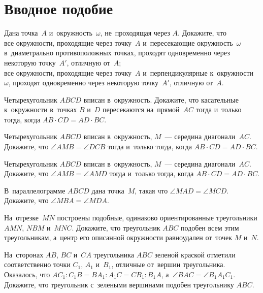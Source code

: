 
\section*{Вводное подобие}


\begin{problems}

\item
Дана точка~$A$ и~окружность~$\omega$, не~проходящая через $A$.
Докажите, что
\\
\subproblem
все окружности, проходящие через точку~$A$ и~пересекающие окружность~$\omega$
в~диаметрально противоположных точках, проходят одновременно через некоторую
точку~$A'$, отличную от~$A$;
\\
\subproblem
все окружности, проходящие через точку~$A$ и~перпендикулярные
к~окружности~$\omega$, проходят одновременно через некоторую точку~$A'$,
отличную от~$A$.

\item
Четырехугольник $ABCD$ вписан в~окружность.
Докажите, что касательные к~окружности в~точках $B$ и~$D$ пересекаются
на~прямой~$AC$ тогда и~только тогда, когда $AB \cdot CD = AD \cdot BC$.

\item
Четырехугольник $ABCD$ вписан в~окружность, $M$~--- середина диагонали~$AC$.
Докажите, что $\angle AMB = \angle DCB$ тогда и~только тогда, когда
$AB \cdot CD = AD \cdot BC$.

\item
Четырехугольник $ABCD$ вписан в~окружность, $M$~--- середина диагонали~$AC$.
Докажите, что $\angle AMB = \angle AMD$ тогда и~только тогда, когда
$AB \cdot CD = AD \cdot BC$.

\item
В~параллелограмме $ABCD$ дана точка~$M$, такая что $\angle MAD = \angle MCD$.
Докажите, что $\angle MBA = \angle MDA$.

\item
На~отрезке~$MN$ построены подобные, одинаково ориентированные треугольники
$AMN$, $NBM$ и~$MNC$.
Докажите, что треугольник $ABC$ подобен всем этим треугольникам, а~центр его
описанной окружности равноудален от~точек $M$ и~$N$.

\item
На~сторонах $AB$, $BC$ и~$CA$ треугольника $ABC$ зеленой краской отметили
соответственно точки $C_1$, $A_1$ и~$B_1$, отличные от~вершин треугольника.
Оказалось, что
\(
    A C_1 : C_1 B
=
    B A_1 : A_1 C
=
    C B_1 : B_1 A
\),
а~$\angle BAC = \angle B_1 A_1 C_1$.
Докажите, что треугольник с~зелеными вершинами подобен треугольнику $ABC$.


\end{problems}
